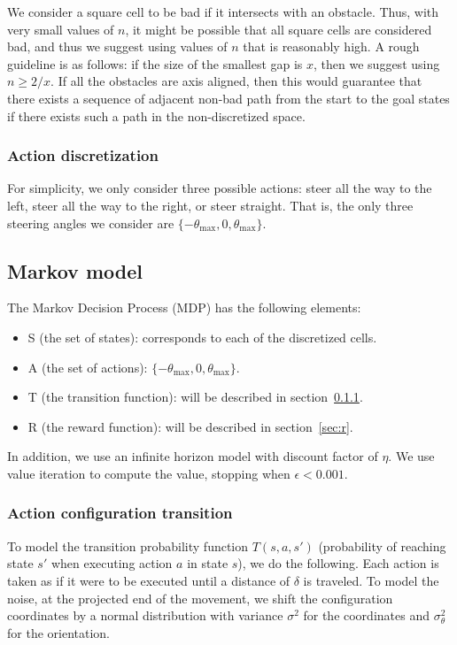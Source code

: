 \documentclass[10pt,a4paper,oneside]{article}
\begin{document}
We consider a square cell to be bad if it intersects with an obstacle. Thus, with
very small values of $n$, it might be possible that all square cells are considered
bad, and thus we suggest using values of $n$ that is reasonably high. A rough
guideline is as follows: if the size of the smallest gap is $x$, then we
suggest using $n \ge 2/x$. If all the obstacles are axis aligned, then this
would guarantee that there exists a sequence of adjacent non-bad path from the
start to the goal states if there exists such a path in the non-discretized space.

\subsubsection{Action discretization}
For simplicity, we only consider three possible actions: steer all the way
to the left, steer all the way to the right, or steer straight. That is,
the only three steering angles we consider are $\{-\theta_\text{max}, 0, \theta_\text{max}\}$.

\subsection{Markov model}
The Markov Decision Process (MDP) has the following elements:
\begin{itemize}
  \item S (the set of states): corresponds to each of the discretized cells.
  \item A (the set of actions): $\{-\theta_\text{max}, 0, \theta_\text{max}\}$.
  \item T (the transition function): will be described in section~\ref{sec:t}.
  \item R (the reward function): will be described in section~\ref{sec:r}.
\end{itemize}

In addition, we use an infinite horizon model with discount factor of $\eta$.
We use value iteration to compute the value, stopping when $\epsilon < 0.001$.

\subsubsection{Action configuration transition}
\label{sec:t}
To model the transition probability function $T(s, a, s')$ (probability of
reaching state $s'$ when executing action $a$ in state $s$), we do the following.
Each action is taken as if it were to be executed until a distance of $\delta$
is traveled. To model the noise, at the projected end of the movement, we
shift the configuration coordinates by a normal distribution with variance
$\sigma^2$ for the coordinates and $\sigma_\theta^2$ for the orientation.
\end{document}
